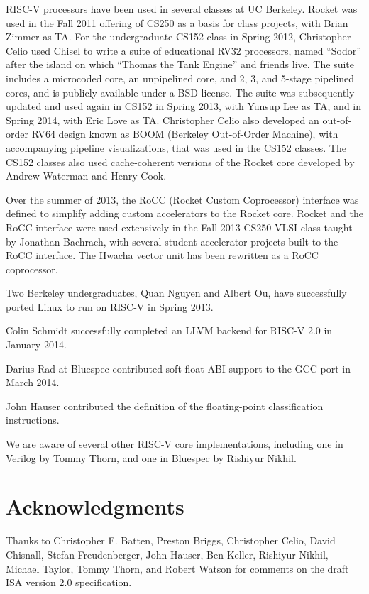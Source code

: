 RISC-V processors have been used in several classes at UC Berkeley.
Rocket was used in the Fall 2011 offering of CS250 as a basis for class
projects, with Brian Zimmer as TA.  For the undergraduate CS152 class in
Spring 2012, Christopher Celio used Chisel to write a suite of educational
RV32 processors, named ``Sodor'' after the island on which ``Thomas the
Tank Engine'' and friends live.  The suite includes a microcoded core,
an unpipelined core, and 2, 3, and 5-stage pipelined cores, and is
publicly available under a BSD license.  The suite was subsequently
updated and used again in CS152 in Spring 2013, with Yunsup Lee as TA,
and in Spring 2014, with Eric Love as TA.
Christopher Celio also developed an out-of-order RV64 design known as BOOM
(Berkeley Out-of-Order Machine), with accompanying pipeline
visualizations, that was used in the CS152 classes.  The CS152 classes
also used cache-coherent versions of the Rocket core developed by Andrew
Waterman and Henry Cook.

Over the summer of 2013, the RoCC (Rocket Custom Coprocessor)
interface was defined to simplify adding custom accelerators to the
Rocket core.  Rocket and the RoCC interface were used extensively in
the Fall 2013 CS250 VLSI class taught by Jonathan Bachrach, with
several student accelerator projects built to the RoCC interface.  The
Hwacha vector unit has been rewritten as a RoCC coprocessor.

Two Berkeley undergraduates, Quan Nguyen and Albert Ou, have
successfully ported Linux to run on RISC-V in Spring 2013.

Colin Schmidt successfully completed an LLVM backend for RISC-V 2.0 in
January 2014.

Darius Rad at Bluespec contributed soft-float ABI support to the GCC port in
March 2014.

John Hauser contributed the definition of the floating-point classification
instructions.

We are aware of several other RISC-V core implementations, including
one in Verilog by Tommy Thorn, and one in Bluespec by Rishiyur Nikhil.

\section*{Acknowledgments}

Thanks to Christopher F. Batten, Preston Briggs, Christopher Celio, David
Chisnall, Stefan Freudenberger, John Hauser, Ben Keller, Rishiyur
Nikhil, Michael Taylor, Tommy Thorn, and Robert Watson for comments on
the draft ISA version 2.0 specification.

